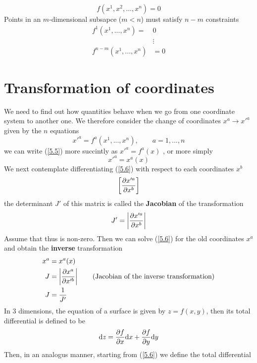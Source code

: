 \begin{equation}       \label{5.3}
  f(x^1,x^2,..., x^n)=0
\end{equation}
Points in an $m$-dimensional subsapce ($m<n$) must satisfy $n-m$ constraints
\begin{align}
\nonumber  f^1(x^1,...,x^n)=&0\\
\label{5.4}          &\vdots    \\
  \nonumber f^{n-m}(x^1,...,x^n)&=0
\end{align}

\section{Transformation of coordinates}
We need to find out how quantities behave when we go from one coordinate system to another one. We therefore consider the change of coordinates $x^{a}\to x'^{a}$ given by the $n$ equations
\begin{equation}\label{5.5}
  x'^{a}=f^{a}(x^1,...,x^n),\qquad a=1,...,n 
\end{equation}
we can write (\ref{5.5}) more succintly as $x'^{a}=f^{a}(x)$ , or more simply
\begin{equation}        \label{5.6}
  \boxed{x'^{a}=x^{a}(x)}
\end{equation}
We next contemplate differentiating (\ref{5.6}) with respect to each coordinates $x^b$
\begin{equation*}
  \left[\pdv{x'^{a}}{x^b}\right] 
\end{equation*}
the determinant $J'$ of this matrix is called the \textbf{Jacobian} of the transformation 
\begin{equation}                   \label{5.8}
  J'=\left|\pdv{x'^{a}}{x^b}\right|
\end{equation}
Assume that thus is non-zero. Then we can solve (\ref{5.6}) for the old coordinates $x^{a}$ and obtain the \textbf{inverse} transformation
\begin{align*}
  x^{a}&=x^{a}(x)\\
  J&=\left|\pdv{x^{a}}{x'^b}\right| \qquad (\mbox{Jacobian of the inverse transformation})\\
  J&=\frac{1}{J'}
\end{align*}
In 3 dimensions, the equation of a surface is given by $z=f(x,y)$, then its total differential is defined to be
\begin{equation*}
  \dd z =\pdv{f}{x}\dd x + \pdv{f}{y}\dd y
\end{equation*}
Then, in an analogus manner, starting from (\ref{5.6}) we define the total differential 
